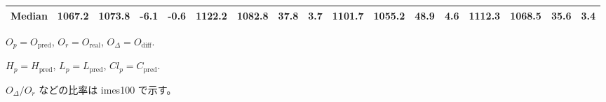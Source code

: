 \begin{threeparttable}
{\begin{tabular}{lrrrrrrrrrrrrrrrr}
 Median & 1067.2 & 1073.8 &       -6.1 &           -0.6 & 1122.2 & 1082.8 &       37.8 &            3.7 & 1101.7 & 1055.2 &       48.9 &            4.6 & 1112.3 & 1068.5 &        35.6 &              3.4 \\
\bottomrule
\end{tabular}
}
\begin{tablenotes}\footnotesize
\item $O_p=O_{\text{pred}}$, $O_r=O_{\text{real}}$, $O_\Delta=O_{\text{diff}}$.
\item $H_p=H_{\text{pred}}$, $L_p=L_{\text{pred}}$, $Cl_p=C_{\text{pred}}$.
\item $O_\Delta/O_r$ などの比率は 	imes100 で示す。
\end{tablenotes}
\end{threeparttable}
\endgroup
